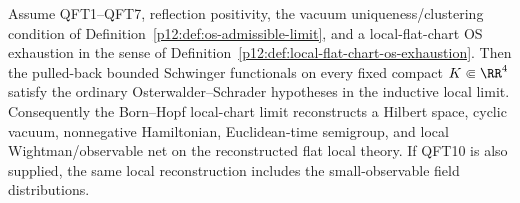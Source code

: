 \documentclass[12pt,a4paper]{article}
\begin{document}
\begin{theorem}
\label{p12:thm:local-chart-os-reconstruction}
Assume QFT1--QFT7, reflection positivity, the vacuum uniqueness/clustering condition of Definition~\ref{p12:def:os-admissible-limit}, and a local-flat-chart OS exhaustion in the sense of Definition~\ref{p12:def:local-flat-chart-os-exhaustion}.  Then the pulled-back bounded Schwinger functionals on every fixed compact \(K\Subset\RR^4\) satisfy the ordinary Osterwalder--Schrader hypotheses in the inductive local limit.  Consequently the Born--Hopf local-chart limit reconstructs a Hilbert space, cyclic vacuum, nonnegative Hamiltonian, Euclidean-time semigroup, and local Wightman/observable net on the reconstructed flat local theory.  If QFT10 is also supplied, the same local reconstruction includes the small-observable field distributions.
\end{theorem}
\end{document}
